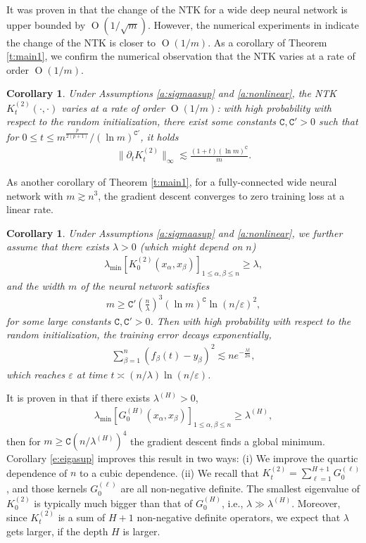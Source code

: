 \documentclass{article}
\numberwithin{equation}{section}
\newcommand{\fC}{{\mathtt C}}
\newcommand{\al}{\alpha}
\newcommand{\la}{\lambda}
\DeclareMathOperator{\OO}{O}
\renewcommand{\leq}{\leqslant}
\renewcommand{\geq}{\geqslant}
\newcommand{\del}{\partial}
\newcommand{\1}{\mathds{1}}
\theoremstyle{plain} %
\newtheorem{corollary}[theorem]{Corollary}
\begin{document}
It was proven in \cite{du2018gradient2, lee2019wide} that  the change of the NTK for a wide deep neural network is upper bounded by $\OO(1/\sqrt m)$. However, the numerical experiments in \cite{lee2019wide} indicate the change of the NTK is closer to $\OO(1/m)$. As a corollary of Theorem \ref{t:main1}, we confirm the numerical observation that the NTK varies at a rate of order $\OO(1/m)$. 
\begin{corollary}\label{c:change}
Under Assumptions \ref{a:sigmaasup} and \ref{a:nonlinear}, the NTK $K_t^{(2)}(\cdot, \cdot)$ varies at a rate of order $\OO(1/m)$: with high probability with respect to the random initialization, there exist some constants $\fC, \fC'>0$ such that  for $0\leq t\leq m^{\frac{p}{2(p+1)}}/(\ln m)^{\fC'}$, it holds
\begin{align*}
\|\del_t K_t^{(2)}\|_\infty\lesssim \frac{(1+t)(\ln m)^\fC}{m}.
\end{align*}

\end{corollary}



As another corollary of Theorem \ref{t:main1}, for a fully-connected wide neural network with $m\gtrsim n^3$, the gradient descent converges to zero training loss at a linear rate. 
\begin{corollary}\label{c:zeroloss}
Under Assumptions \ref{a:sigmaasup} and \ref{a:nonlinear}, we further assume that there exists $\la>0$ (which might depend on $n$)  
\begin{align}\label{e:eigasup}
\la_{\min} \left[K_0^{(2)}(x_\al, x_\beta)\right]_{1\leq \al, \beta\leq n}\geq \la,
\end{align}
and the width $m$ of the neural network satisfies
\begin{align}\label{mn}
m\geq \fC'\left(\frac{n}{\la}\right)^3(\ln m)^{\fC}\ln(n/\varepsilon)^2,
\end{align} 
for some large constants $\fC, \fC'>0$. Then with high probability with respect to the random initialization, the training error decays exponentially,
\begin{align*}
\sum_{\beta=1}^n(f_\beta(t)-y_\beta)^2
\lesssim n e^{-\frac{\la t}{2n}},
\end{align*}
which reaches $\varepsilon$ at time $t\asymp (n/\la)\ln(n/\varepsilon)$.
\end{corollary}


It is proven in \cite{du2018gradient2} that if there exists $\la^{(H)}>0$,
\begin{align*}
\la_{\min}\left[G_0^{(H)}(x_\al, x_\beta)\right]_{1\leq \al, \beta\leq n}\geq \la^{(H)},
\end{align*} 
then for $m\geq \fC (n/\la^{(H)})^4$ the gradient descent finds a global minimum. Corollary \ref{e:eigasup} improves this result in two ways: (i) We improve the quartic dependence of $n$ to a cubic dependence.
(ii) We recall that $K_t^{(2)}=\sum_{\ell=1}^{H+1}G_0^{(\ell)}$, and those kernels $G_0^{(\ell)}$ are all non-negative definite. The smallest eigenvalue of $K_0^{(2)}$ is typically much bigger than that of $G_0^{(H)}$, i.e., $\la\gg \la^{(H)}$.
Moreover, since $K_t^{(2)}$ is a sum of $H+1$ non-negative definite operators, we expect that $\la$ gets larger, if the depth $H$ is larger. 
\end{document}
